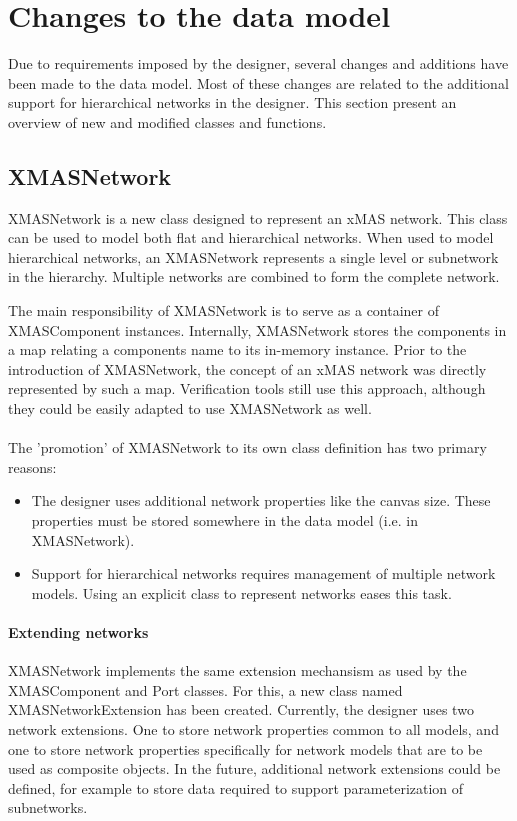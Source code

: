\section{Changes to the data model}

Due to requirements imposed by the designer, several changes and additions have
been made to the data model. Most of these changes are related to the additional
support for hierarchical networks in the designer. This section present an overview
of new and modified classes and functions.

\subsection{XMASNetwork}

XMASNetwork is a new class designed to represent an xMAS network. This class can be
used to model both flat and hierarchical networks. When used to model hierarchical
networks, an XMASNetwork represents a single level or subnetwork in the hierarchy.
Multiple networks are combined to form the complete network.

The main responsibility of XMASNetwork is to serve as a container of XMASComponent
instances. Internally, XMASNetwork stores the components in a map relating a
components name to its in-memory instance. Prior to the introduction of XMASNetwork,
the concept of an xMAS network was directly represented by such a map. Verification
tools still use this approach, although they could be easily adapted to use
XMASNetwork as well.

\paragraph{}
The 'promotion' of XMASNetwork to its own class definition has two primary reasons:
\begin{itemize}
 \item The designer uses additional network properties like the canvas size. These
 properties must be stored somewhere in the data model (i.e. in XMASNetwork).
 \item Support for hierarchical networks requires management of multiple network
 models. Using an explicit class to represent networks eases this task.
\end{itemize}

\paragraph{Extending networks}
XMASNetwork implements the same extension mechansism as used by the XMASComponent and
Port classes. For this, a new class named XMASNetworkExtension has been created.
Currently, the designer uses two network extensions. One to store network
properties common to all models, and one to store network properties specifically
for network models that are to be used as composite objects.
In the future, additional network extensions could be defined, for example to store
data required to support parameterization of subnetworks.

